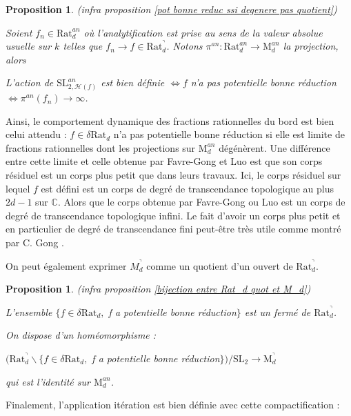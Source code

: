 \documentclass[11pt]{article}
\newcommand{\C}{\mathbb{C}}
\newcommand{\Rat}{\mathrm{Rat}}
\newcommand{\SL}{\mathrm{SL}}
\newcommand{\M}{\mathrm{M}}
\newtheorem{prop}[thm]{Proposition}
\begin{document}
\begin{prop}(infra proposition \ref{pot bonne reduc ssi degenere pas quotient})

Soient $f_n \in \mathrm{Rat}_d^{an}$ où l'analytification est prise au sens de la valeur absolue usuelle sur $k$ telles que $f_n \rightarrow f \in \mathrm{Rat}_d^\urcorner$. Notons $\pi^{an} : \Rat_d^{an} \rightarrow \M_d^{an}$ la projection, alors
\begin{center}
L'action de $\SL^{an}_{2,\mathcal{H}(f)}$ est bien définie $\iff f$ n'a pas potentielle bonne réduction$ \iff \pi^{an}(f_n) \rightarrow \infty$.
\end{center} 
\end{prop}

Ainsi, le comportement dynamique des fractions rationnelles du bord est bien celui attendu : $f \in \delta \Rat_d$ n'a pas potentielle bonne réduction si elle est limite de fractions rationnelles dont les projections sur $\M_d^{an}$ dégénèrent. Une différence entre cette limite et celle obtenue par Favre-Gong \cite{FavreGong} et Luo \cite{LuoLimitRationalMap} est que son corps résiduel est un corps plus petit que dans leurs travaux. Ici, le corps résiduel sur lequel $f$ est défini est un corps de degré de transcendance topologique au plus $2d-1$ sur $\C$. Alors que le corps obtenue par Favre-Gong ou Luo est un corps de degré de transcendance topologique infini. Le fait d'avoir un corps plus petit et en particulier de degré de transcendance fini peut-être très utile comme montré par C. Gong \cite{GongMultiplierScale}.

On peut également exprimer $M_d^\urcorner$ comme un quotient d'un ouvert de $\Rat_d^\urcorner$.

\begin{prop}(infra proposition \ref{bijection entre Rat_d quot et M_d})

L'ensemble $\lbrace f\in \delta \Rat_d,$ f a potentielle bonne réduction$\rbrace$ est un fermé de $\Rat_d^\urcorner$.

On dispose d'un homéomorphisme :
\begin{center}
$(\Rat_d^\urcorner \backslash \lbrace f\in \delta \Rat_d,$ f a potentielle bonne réduction$\rbrace)/\SL_2 \rightarrow \M_d^\urcorner$
\end{center}
qui est l'identité sur $\M_d^{an}$.
\end{prop}

Finalement, l'application itération est bien définie avec cette compactification :
\end{document}
